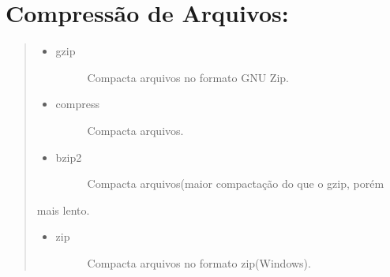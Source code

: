 \documentclass[a4paper,10pt,brazil]{sphinxmanual}
\begin{document}
\section{Compressão de Arquivos:}
\label{unix:compressao-de-arquivos}\begin{quote}
\begin{itemize}
\item {} \begin{description}
\item[{gzip}] \leavevmode
Compacta arquivos no formato GNU Zip.

\end{description}

\item {} \begin{description}
\item[{compress}] \leavevmode
Compacta arquivos.

\end{description}

\item {} \begin{description}
\item[{bzip2}] \leavevmode
Compacta arquivos(maior compactação do que o gzip, porém

\end{description}

\end{itemize}

mais lento.
\begin{itemize}
\item {} \begin{description}
\item[{zip}] \leavevmode
Compacta arquivos no formato zip(Windows).

\end{description}

\end{itemize}
\end{quote}
\end{document}
